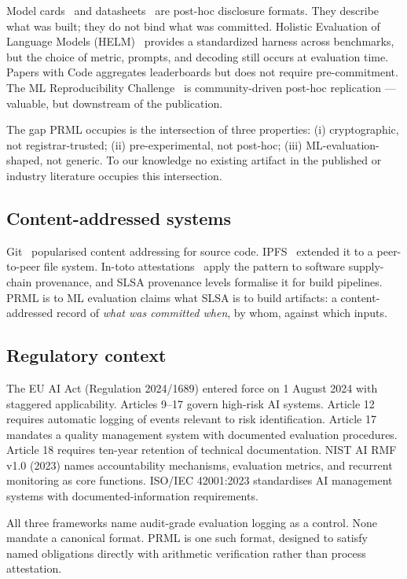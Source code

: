 \documentclass[11pt, a4paper]{article}
\begin{document}
Model cards~\cite{mitchell2019modelcards} and datasheets~\cite{gebru2018datasheets} are post-hoc disclosure formats. They describe what was built; they do not bind what was committed. Holistic Evaluation of Language Models (HELM)~\cite{liang2023helm} provides a standardized harness across benchmarks, but the choice of metric, prompts, and decoding still occurs at evaluation time. Papers with Code aggregates leaderboards but does not require pre-commitment. The ML Reproducibility Challenge~\cite{pineau2021reproducibility} is community-driven post-hoc replication --- valuable, but downstream of the publication.

The gap PRML occupies is the intersection of three properties: (i) cryptographic, not registrar-trusted; (ii) pre-experimental, not post-hoc; (iii) ML-evaluation-shaped, not generic. To our knowledge no existing artifact in the published or industry literature occupies this intersection.

\subsection{Content-addressed systems}

Git~\cite{git2005} popularised content addressing for source code. IPFS~\cite{benet2014ipfs} extended it to a peer-to-peer file system. In-toto attestations~\cite{torresarias2019intoto} apply the pattern to software supply-chain provenance, and SLSA provenance levels formalise it for build pipelines. PRML is to ML evaluation claims what SLSA is to build artifacts: a content-addressed record of \emph{what was committed when}, by whom, against which inputs.

\subsection{Regulatory context}

The EU AI Act (Regulation 2024/1689) entered force on 1 August 2024 with staggered applicability. Articles 9--17 govern high-risk AI systems. Article 12 requires automatic logging of events relevant to risk identification. Article 17 mandates a quality management system with documented evaluation procedures. Article 18 requires ten-year retention of technical documentation. NIST AI RMF v1.0 (2023) names accountability mechanisms, evaluation metrics, and recurrent monitoring as core functions. ISO/IEC 42001:2023 standardises AI management systems with documented-information requirements.

All three frameworks name audit-grade evaluation logging as a control. None mandate a canonical format. PRML is one such format, designed to satisfy named obligations directly with arithmetic verification rather than process attestation.
\end{document}
